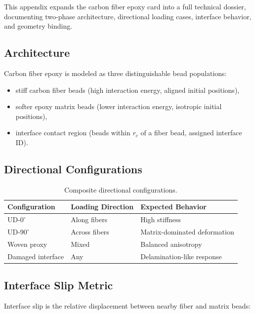 \documentclass[12pt]{article}
\begin{document}
This appendix expands the carbon fiber epoxy card into a full technical dossier,
documenting two-phase architecture, directional loading cases, interface behavior,
and geometry binding.

\subsection{Architecture}

Carbon fiber epoxy is modeled as three distinguishable bead populations:

\begin{itemize}[noitemsep]
	\item stiff carbon fiber beads (high interaction energy, aligned initial positions),
	\item softer epoxy matrix beads (lower interaction energy, isotropic initial positions),
	\item interface contact region (beads within $r_c$ of a fiber bead, assigned interface ID).
\end{itemize}

\subsection{Directional Configurations}

\begin{table}[H]
\centering
\caption{Composite directional configurations.}
\label{tab:app_cfe_configs}
\begin{tabular}{p{}p{}p{}}
\toprule
\textbf{Configuration} & \textbf{Loading Direction} & \textbf{Expected Behavior} \\
\midrule
UD-$0^\circ$       & Along fibers    & High stiffness \\
UD-$90^\circ$      & Across fibers   & Matrix-dominated deformation \\
Woven proxy        & Mixed           & Balanced anisotropy \\
Damaged interface  & Any             & Delamination-like response \\
\bottomrule
\end{tabular}
\end{table}

\subsection{Interface Slip Metric}

Interface slip is the relative displacement between nearby fiber and matrix beads:
\end{document}
